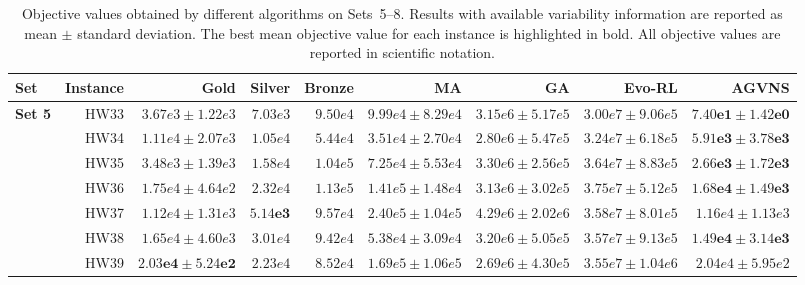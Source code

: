 \documentclass[pdflatex]{sn-jnl}
\begin{document}
\begin{table}
\centering
\caption{Objective values obtained by different algorithms on Sets~5--8.
Results with available variability information are reported as mean $\pm$ standard deviation.
The best mean objective value for each instance is highlighted in bold.
All objective values are reported in scientific notation.}
\label{tab:results_set5_8}

\setlength{\tabcolsep}{2.5pt}
\scriptsize

\begin{tabular}{l|r|r|r|r|r|r|r|r}
\hline
\textbf{Set}
& \textbf{Instance}
& \textbf{Gold}
& \textbf{Silver}
& \textbf{Bronze}
& \textbf{MA}
& \textbf{GA}
& \textbf{Evo-RL}
& \textbf{AGVNS} \\
\hline

\multirow{8}{*}{\textbf{Set 5}}
& HW33 & $3.67e3 \pm 1.22e3$ & $7.03e3$ & $9.50e4$
& $9.99e4 \pm 8.29e4$
& $3.15e6 \pm 5.17e5$
& $3.00e7 \pm 9.06e5$
& $\mathbf{7.40e1 \pm 1.42e0}$ \\

& HW34 & $1.11e4 \pm 2.07e3$ & $1.05e4$ & $5.44e4$
& $3.51e4 \pm 2.70e4$
& $2.80e6 \pm 5.47e5$
& $3.24e7 \pm 6.18e5$
& $\mathbf{5.91e3 \pm 3.78e3}$ \\

& HW35 & $3.48e3 \pm 1.39e3$ & $1.58e4$ & $1.04e5$
& $7.25e4 \pm 5.53e4$
& $3.30e6 \pm 2.56e5$
& $3.64e7 \pm 8.83e5$
& $\mathbf{2.66e3 \pm 1.72e3}$ \\

& HW36 & $1.75e4 \pm 4.64e2$ & $2.32e4$ & $1.13e5$
& $1.41e5 \pm 1.48e4$
& $3.13e6 \pm 3.02e5$
& $3.75e7 \pm 5.12e5$
& $\mathbf{1.68e4 \pm 1.49e3}$ \\

& HW37 & $1.12e4 \pm 1.31e3$ & $\mathbf{5.14e3}$ & $9.57e4$
& $2.40e5 \pm 1.04e5$
& $4.29e6 \pm 2.02e6$
& $3.58e7 \pm 8.01e5$
& $1.16e4 \pm 1.13e3$ \\

& HW38 & $1.65e4 \pm 4.60e3$ & $3.01e4$ & $9.42e4$
& $5.38e4 \pm 3.09e4$
& $3.20e6 \pm 5.05e5$
& $3.57e7 \pm 9.13e5$
& $\mathbf{1.49e4 \pm 3.14e3}$ \\

& HW39 & $\mathbf{2.03e4 \pm 5.24e2}$ & $2.23e4$ & $8.52e4$
& $1.69e5 \pm 1.06e5$
& $2.69e6 \pm 4.30e5$
& $3.55e7 \pm 1.04e6$
& $2.04e4 \pm 5.95e2$ \\


\end{tabular}
\end{table}
\end{document}
